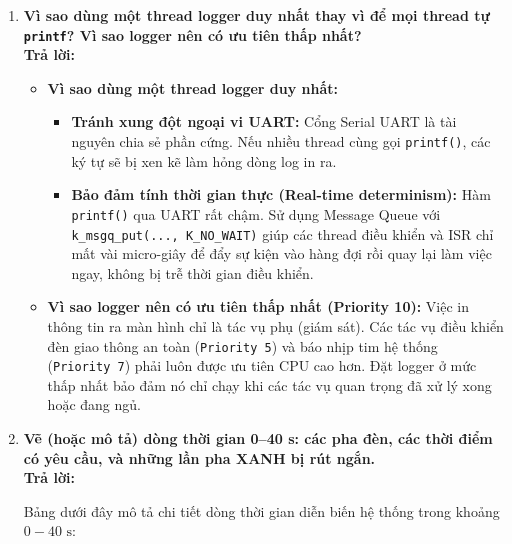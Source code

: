 \begin{enumerate}[label=(\alph*)]
    \item \textbf{Vì sao dùng một thread logger duy nhất thay vì để mọi thread tự \texttt{printf}? Vì sao logger nên có ưu tiên thấp nhất?} \\
    \textbf{Trả lời:}
    \begin{itemize}
        \item \textbf{Vì sao dùng một thread logger duy nhất:}
        \begin{itemize}
            \item \textbf{Tránh xung đột ngoại vi UART:} Cổng Serial UART là tài nguyên chia sẻ phần cứng. Nếu nhiều thread cùng gọi \texttt{printf()}, các ký tự sẽ bị xen kẽ làm hỏng dòng log in ra.
            \item \textbf{Bảo đảm tính thời gian thực (Real-time determinism):} Hàm \texttt{printf()} qua UART rất chậm. Sử dụng Message Queue với \texttt{k\_msgq\_put(..., K\_NO\_WAIT)} giúp các thread điều khiển và ISR chỉ mất vài micro-giây để đẩy sự kiện vào hàng đợi rồi quay lại làm việc ngay, không bị trễ thời gian điều khiển.
        \end{itemize}
        \item \textbf{Vì sao logger nên có ưu tiên thấp nhất (Priority 10):} Việc in thông tin ra màn hình chỉ là tác vụ phụ (giám sát). Các tác vụ điều khiển đèn giao thông an toàn (\texttt{Priority 5}) và báo nhịp tim hệ thống (\texttt{Priority 7}) phải luôn được ưu tiên CPU cao hơn. Đặt logger ở mức thấp nhất bảo đảm nó chỉ chạy khi các tác vụ quan trọng đã xử lý xong hoặc đang ngủ.
    \end{itemize}
    
    \item \textbf{Vẽ (hoặc mô tả) dòng thời gian 0–40 s: các pha đèn, các thời điểm có yêu cầu, và những lần pha XANH bị rút ngắn.} \\
    \textbf{Trả lời:}
    
    Bảng dưới đây mô tả chi tiết dòng thời gian diễn biến hệ thống trong khoảng $0 - 40\text{ s}$:
    

\end{enumerate}
